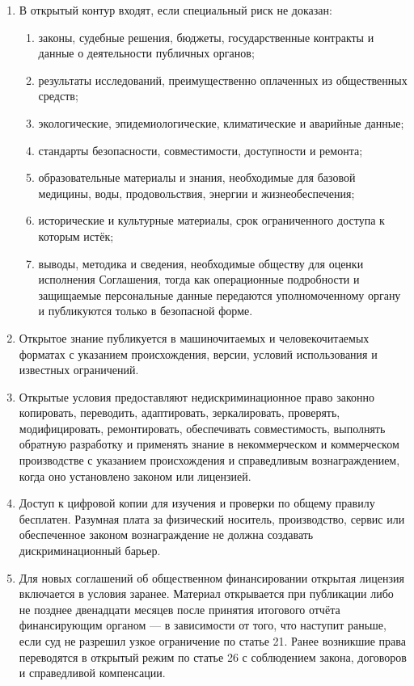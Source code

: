 \documentclass[
  russian,
  11pt,
  a4paper,
]{article}
\providecommand{\tightlist}{%
  \setlength{\itemsep}{0pt}\setlength{\parskip}{0pt}}
\begin{document}
\begin{enumerate}
\def\labelenumi{\arabic{enumi}.}
\tightlist
\item
  В открытый контур входят, если специальный риск не доказан:

  \begin{enumerate}
  \def\labelenumii{\arabic{enumii}.}
  \tightlist
  \item
    законы, судебные решения, бюджеты, государственные контракты и
    данные о деятельности публичных органов;
  \item
    результаты исследований, преимущественно оплаченных из общественных
    средств;
  \item
    экологические, эпидемиологические, климатические и аварийные данные;
  \item
    стандарты безопасности, совместимости, доступности и ремонта;
  \item
    образовательные материалы и знания, необходимые для базовой
    медицины, воды, продовольствия, энергии и жизнеобеспечения;
  \item
    исторические и культурные материалы, срок ограниченного доступа к
    которым истёк;
  \item
    выводы, методика и сведения, необходимые обществу для оценки
    исполнения Соглашения, тогда как операционные подробности и
    защищаемые персональные данные передаются уполномоченному органу и
    публикуются только в безопасной форме.
  \end{enumerate}
\item
  Открытое знание публикуется в машиночитаемых и человекочитаемых
  форматах с указанием происхождения, версии, условий использования и
  известных ограничений.
\item
  Открытые условия предоставляют недискриминационное право законно
  копировать, переводить, адаптировать, зеркалировать, проверять,
  модифицировать, ремонтировать, обеспечивать совместимость, выполнять
  обратную разработку и применять знание в некоммерческом и коммерческом
  производстве с указанием происхождения и справедливым вознаграждением,
  когда оно установлено законом или лицензией.
\item
  Доступ к цифровой копии для изучения и проверки по общему правилу
  бесплатен. Разумная плата за физический носитель, производство, сервис
  или обеспеченное законом вознаграждение не должна создавать
  дискриминационный барьер.
\item
  Для новых соглашений об общественном финансировании открытая лицензия
  включается в условия заранее. Материал открывается при публикации либо
  не позднее двенадцати месяцев после принятия итогового отчёта
  финансирующим органом --- в зависимости от того, что наступит раньше,
  если суд не разрешил узкое ограничение по статье 21. Ранее возникшие
  права переводятся в открытый режим по статье 26 с соблюдением закона,
  договоров и справедливой компенсации.
\end{enumerate}
\end{document}
